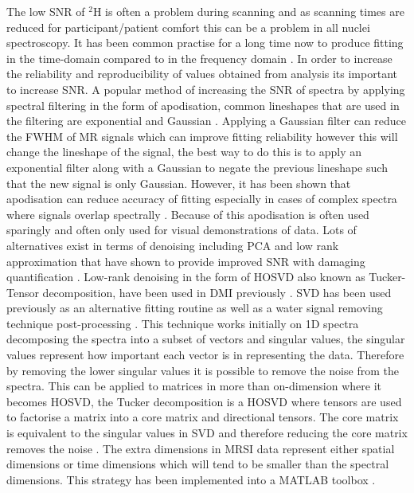 The low \ac{SNR} of $^2$H is often a problem during scanning and as scanning times are reduced for participant/patient comfort this can be a problem in all nuclei spectroscopy. It has been common practise for a long time now to produce fitting in the time-domain compared to in the frequency domain \cite{Joliot1991InMethods}. In order to increase the reliability and reproducibility of values obtained from analysis its important to increase \ac{SNR}. A popular method of increasing the \ac{SNR} of spectra by applying spectral filtering in the form of apodisation, common lineshapes that are used in the filtering are exponential and Gaussian \cite{Goryawala2020EffectsFitting}. Applying a Gaussian filter can reduce the \ac{FWHM} of MR signals which can improve fitting reliability however this will change the lineshape of the signal, the best way to do this is to apply an exponential filter along with a Gaussian to negate the previous lineshape such that the new signal is only Gaussian. However, it has been shown that apodisation can reduce accuracy of fitting especially in cases of complex spectra where signals overlap spectrally \cite{Bartha1999FactorsFiltering}. Because of this apodisation is often used sparingly and often only used for visual demonstrations of data. Lots of alternatives exist in terms of denoising including \ac{PCA} \cite{Abdoli2016DenoisingComponents} and low rank approximation \cite{Nguyen2013DenoisingApproximations} that have shown to provide improved \ac{SNR} with damaging quantification \cite{Clarke2022UncertaintyMethods}. Low-rank denoising in the form of \ac{HOSVD} also known as Tucker-Tensor decomposition, have been used in \ac{DMI} previously \cite{Kreis2020MeasuringMRI,Assmann2020InCholesterol}. \ac{SVD} has been used previously as an alternative fitting routine \cite{Pijnappel1992SVD-basedSignals} as well as a water signal removing technique post-processing \cite{Cabanes2001OptimizationBrain}. This technique works initially on 1D spectra decomposing the spectra into a subset of vectors and singular values, the singular values represent how important each vector is in representing the data. Therefore by removing the lower singular values it is possible to remove the noise from the spectra. This can be applied to matrices in more than on-dimension where it becomes \ac{HOSVD}, the Tucker decomposition is a \ac{HOSVD} where tensors are used to factorise a matrix into a core matrix and directional tensors. The core matrix is equivalent to the singular values in \ac{SVD} and therefore reducing the core matrix removes the noise \cite{Tucker1966SomeAnalysis}. The extra dimensions in \ac{MRSI} data represent either spatial dimensions or time dimensions which will tend to be smaller than the spectral dimensions. This strategy has been implemented into a MATLAB toolbox \cite{Bader2007EfficientTensors}.

